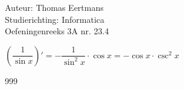 \documentclass[a4paper]{article}
\begin{document}
  
\noindent \large Auteur: Thomas Eertmans \\
\noindent \large Studierichting: Informatica\\
\noindent \large Oefeningenreeks 3A nr. 23.4\\

\medskip

\normalsize

$\left(\dfrac{1}{\sin x}\right)' = -\dfrac{1}{\sin^2 x} \cdot \cos x = -\cos x \cdot \csc^2 x$

\begin{thebibliography}{999}
\end{thebibliography}
\end{document}
